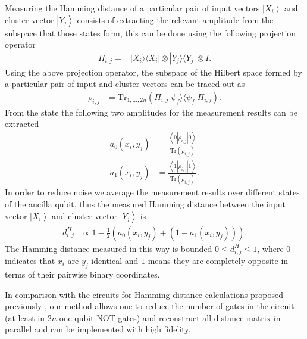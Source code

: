 \documentclass[pra,showkeys,twocolumn,showpacs]{revtex4-1}
\begin{document}
Measuring the Hamming distance of a particular pair of input vectors $\left| X_i \right\rangle$ and cluster vector $\left| Y_j \right\rangle$ consists of extracting the relevant amplitude from the subspace that those states form, 
this can be done using the following projection operator
%
\begin{align}
\Pi_{i,j} = &\left| X_i \rangle\langle X_i \right| \otimes \left| Y_j \rangle\langle Y_j \right| \otimes I .
\end{align} 
%
Using the above projection operator, the subspace of the Hilbert space formed by a particular pair of input and cluster vectors can be traced out as
%
\begin{align}
    \rho_{i,j} &= \text{Tr}_{1,\dots,2n} (\Pi_{i,j} \left| \psi_f \rangle\langle \psi_f \right| \Pi_{i,j}) .
\end{align}
%
From the state the following two amplitudes for the measurement results can be extracted
%
\begin{align}
    a_0(x_i,y_j) & = \frac{\left\langle 0 |\rho_{i,j}| 0 \right\rangle}{\text{Tr}(\rho_{i,j})}  \\
    a_1(x_i,y_j) & = \frac{\left\langle 1 |\rho_{i,j}| 1 \right\rangle}{\text{Tr}(\rho_{i,j})} .
\end{align}
%
In order to reduce noise we average the measurement results over different states of the ancilla qubit, 
thus the measured Hamming distance between the input vector $\left| X_i \right\rangle$ and cluster vector $\left| Y_j \right\rangle$ is
%
\begin{align}
    d_{i,j}^H & \propto 1 - \frac{1}{2}(a_0(x_i,y_j) + (1-a_1(x_i,y_j))) .
\end{align}
%
The Hamming distance measured in this way is bounded $0 \leq d_{i,j}^H \leq 1$, 
where  $0$ indicates that $x_i$ are $y_j$ identical and $1$ means they are completely opposite in terms of their pairwise binary coordinates.

In comparison with the circuits for Hamming distance calculations proposed previously \cite{trugenberger2001}, 
our method allows one to reduce the number of gates in the circuit (at least in $2n$ one-qubit NOT gates)
and reconstruct all distance matrix in parallel and can be implemented with high fidelity.  
\end{document}

